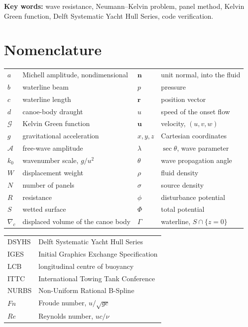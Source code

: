 \documentclass[11pt]{article}
\newcommand{\Fn}{\mathit{Fn}}
\begin{document}
\noindent\textbf{Key words:} wave resistance, Neumann--Kelvin problem, panel method,
Kelvin Green function, Delft Systematic Yacht Hull Series, code verification.

\section*{Nomenclature}
\noindent
\begin{tabular}{@{}ll@{\hspace{10mm}}ll@{}}
$a$      & Michell amplitude, nondimensional      & $\bm{n}$ & unit normal, into the fluid\\
$b$      & waterline beam                          & $p$      & pressure\\
$c$      & waterline length                        & $\bm{r}$ & position vector\\
$d$      & canoe-body draught                      & $u$      & speed of the onset flow\\
$\mathcal{G}$ & Kelvin Green function              & $\bm{u}$ & velocity, $(u,v,w)$\\
$g$      & gravitational acceleration              & $x,y,z$  & Cartesian coordinates\\
$\mathcal{A}$ & free-wave amplitude                & $\lambda$ & $\sec\theta$, wave parameter\\
$k_0$    & wavenumber scale, $g/u^2$               & $\theta$ & wave propagation angle\\
$W$      & displacement weight                     & $\rho$   & fluid density\\
$N$      & number of panels                        & $\sigma$ & source density\\
$R$      & resistance                              & $\phi$   & disturbance potential\\
$S$      & wetted surface                          & $\Phi$   & total potential\\
$\nabla_c$ & displaced volume of the canoe body    & $\Gamma$ & waterline, $S\cap\{z=0\}$\\
\end{tabular}

\vspace{3mm}
\noindent
\begin{tabular}{@{}ll@{}}
DSYHS & Delft Systematic Yacht Hull Series\\
IGES  & Initial Graphics Exchange Specification\\
LCB   & longitudinal centre of buoyancy\\
ITTC  & International Towing Tank Conference\\
NURBS & Non-Uniform Rational B-Spline\\
$\Fn$ & Froude number, $u/\sqrt{gc}$\\
$Re$  & Reynolds number, $uc/\nu$\\
\end{tabular}
\end{document}
